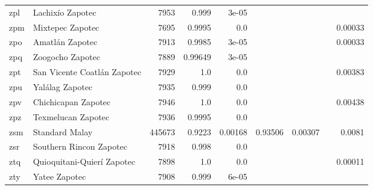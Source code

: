 \documentclass[11pt]{article}
\begin{document}
\begin{table*}[h]
{\begin{tabular}{llrrrrrrr}
zpl         & Lachixío Zapotec         & 7953         & 0.999         & 3e-05         &          &          &          &          \\

zpm         & Mixtepec Zapotec         & 7695         & 0.9995         & 0.0         &          &          &          & 0.00033         \\

zpo         & Amatlán Zapotec         & 7913         & 0.9985         & 3e-05         &          &          &          & 0.00033         \\

zpq         & Zoogocho Zapotec         & 7889         & 0.99649         & 3e-05         &          &          &          &          \\

zpt         & San Vicente Coatlán Zapotec         & 7929         & 1.0         & 0.0         &          &          &          & 0.00383         \\

zpu         & Yalálag Zapotec         & 7935         & 0.999         & 0.0         &          &          &          &          \\

zpv         & Chichicapan Zapotec         & 7946         & 1.0         & 0.0         &          &          &          & 0.00438         \\

zpz         & Texmelucan Zapotec         & 7936         & 0.9995         & 0.0         &          &          &          &          \\

zsm         & Standard Malay         & 445673         & 0.9223         & 0.00168         & 0.93506         & 0.00307         &          & 0.0081         \\

zsr         & Southern Rincon Zapotec         & 7918         & 0.998         & 0.0         &          &          &          &          \\

ztq         & Quioquitani-Quierí Zapotec         & 7898         & 1.0         & 0.0         &          &          &          & 0.00011         \\

zty         & Yatee Zapotec         & 7908         & 0.999         & 6e-05         &          &          &          &          \\


\end{tabular}}
\end{table*}
\end{document}
